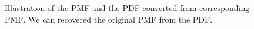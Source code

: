 \documentclass[runningheads,openany]{xhlPaper}
\begin{document}
\begin{figure}
\centering
{}
\caption{Illustration of the PMF and the PDF converted from corresponding PMF. We can recovered the original PMF from the PDF.}
\label{fig:sampPMFConverted}
\end{figure}
\end{document}
